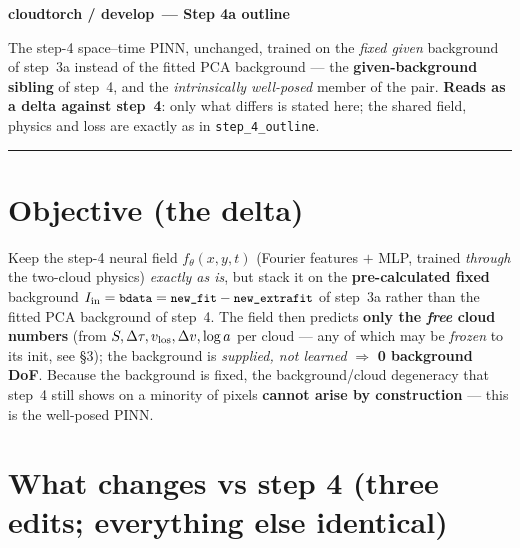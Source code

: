 \documentclass[10pt,a4paper]{article}
\newcommand{\co}[1]{{\small\texttt{#1}}}
\begin{document}
\small

{\sffamily\bfseries\large\color{acc} cloudtorch / develop\, --- Step 4a outline}

\vspace{1pt}
{\sffamily\color{gry}\footnotesize The step-4 space--time PINN, unchanged, trained on the \emph{fixed given} background of step~3a instead of the fitted PCA background --- the \textbf{given-background sibling} of step~4, and the \emph{intrinsically well-posed} member of the pair. \textbf{Reads as a delta against step~4}: only what differs is stated here; the shared field, physics and loss are exactly as in \co{step\_4\_outline}.}

\vspace{1pt}
{\footnotesize\color{gry}\rule{\textwidth}{0.4pt}}

\section{Objective (the delta)}

Keep the step-4 neural field $f_\theta(x,y,t)$ (Fourier features $+$ MLP, trained \emph{through} the two-cloud physics) \emph{exactly as is}, but stack it on the \textbf{pre-calculated fixed} background $I_{\rm in}=\co{bdata}=\co{new\_fit}-\co{new\_extrafit}$ of step~3a rather than the fitted PCA background of step~4. The field then predicts \textbf{only the \emph{free} cloud numbers} (from $S,\Delta\tau,v_{\rm los},\Delta v,\log a$ per cloud --- any of which may be \emph{frozen} to its init, see \S3); the background is \emph{supplied, not learned} $\Rightarrow$ \textbf{0 background DoF}. Because the background is fixed, the background/cloud degeneracy that step~4 still shows on a minority of pixels \textbf{cannot arise by construction} --- this is the well-posed PINN.

\section{What changes vs step 4 (three edits; everything else identical)}
\end{document}
